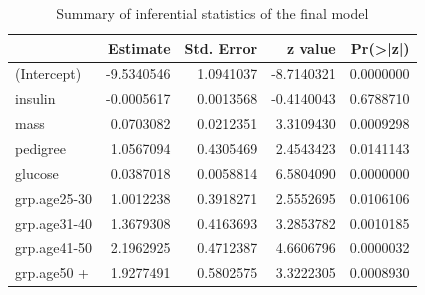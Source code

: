 \documentclass[
]{book}
\newenvironment{Shaded}{\begin{snugshade}}{\end{snugshade}}
\newcommand{\AttributeTok}[1]{\textcolor[rgb]{0.13,0.29,0.53}{#1}}
\newcommand{\ControlFlowTok}[1]{\textcolor[rgb]{0.13,0.29,0.53}{\textbf{#1}}}
\newcommand{\DocumentationTok}[1]{\textcolor[rgb]{0.56,0.35,0.01}{\textbf{\textit{#1}}}}
\newcommand{\FloatTok}[1]{\textcolor[rgb]{0.00,0.00,0.81}{#1}}
\newcommand{\FunctionTok}[1]{\textcolor[rgb]{0.13,0.29,0.53}{\textbf{#1}}}
\newcommand{\NormalTok}[1]{#1}
\newcommand{\OtherTok}[1]{\textcolor[rgb]{0.56,0.35,0.01}{#1}}
\newcommand{\SpecialCharTok}[1]{\textcolor[rgb]{0.81,0.36,0.00}{\textbf{#1}}}
\newcommand{\StringTok}[1]{\textcolor[rgb]{0.31,0.60,0.02}{#1}}
\begin{document}
\begin{table}

\caption{\label{tab:unnamed-chunk-136}Summary of inferential statistics of the final model}
\centering
\begin{tabular}[t]{l|r|r|r|r}
\hline
  & Estimate & Std. Error & z value & Pr(>|z|)\\
\hline
(Intercept) & -9.5340546 & 1.0941037 & -8.7140321 & 0.0000000\\
\hline
insulin & -0.0005617 & 0.0013568 & -0.4140043 & 0.6788710\\
\hline
mass & 0.0703082 & 0.0212351 & 3.3109430 & 0.0009298\\
\hline
pedigree & 1.0567094 & 0.4305469 & 2.4543423 & 0.0141143\\
\hline
glucose & 0.0387018 & 0.0058814 & 6.5804090 & 0.0000000\\
\hline
grp.age25-30 & 1.0012238 & 0.3918271 & 2.5552695 & 0.0106106\\
\hline
grp.age31-40 & 1.3679308 & 0.4163693 & 3.2853782 & 0.0010185\\
\hline
grp.age41-50 & 2.1962925 & 0.4712387 & 4.6606796 & 0.0000032\\
\hline
grp.age50 + & 1.9277491 & 0.5802575 & 3.3222305 & 0.0008930\\
\hline
\end{tabular}
\end{table}

\begin{Shaded}
\end{Shaded}
\end{document}
